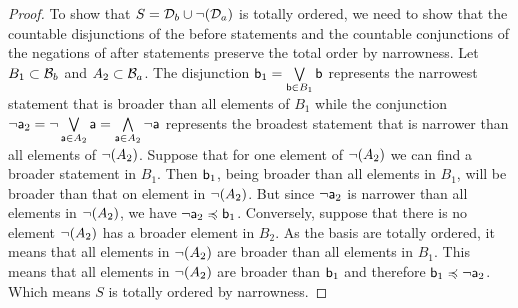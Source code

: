 \documentclass[11pt,letterpaper,fleqn]{memoir} %
\begin{document}
\begin{mathSection}
\begin{proof}
	To show that $S=\edomain_b \cup \NOT (\edomain_a)$ is totally ordered, we need to show that the countable disjunctions of the before statements and the countable conjunctions of the negations of after statements preserve the total order by narrowness. Let $B_1 \subset \basis_b$ and $A_2 \subset \basis_a$. The disjunction $\stmt[b]_1 = \bigOR\limits_{\stmt[b] \in B_1} \stmt[b]$ represents the narrowest statement that is broader than all elements of $B_1$ while the conjunction $\NOT \stmt[a]_2 = \NOT \bigOR\limits_{\stmt[a] \in A_2} \stmt[a] = \bigAND\limits_{\stmt[a] \in A_2} \NOT \stmt[a]$ represents the broadest statement that is narrower than all elements of $\NOT(A_2)$. Suppose that for one element of $\NOT(A_2)$ we can find a broader statement in $B_1$. Then $\stmt[b]_1$, being broader than all elements in $B_1$, will be broader than that on element in $\NOT(A_2)$. But since $\NOT \stmt[a]_2$ is narrower than all elements in $\NOT(A_2)$, we have $\NOT \stmt[a]_2 \narrower \stmt[b]_1$. Conversely, suppose that there is no element $\NOT(A_2)$ has a broader element in $B_2$. As the basis are totally ordered, it means that all elements in $\NOT(A_2)$ are broader than all elements in $B_1$. This means that all elements in $\NOT(A_2)$ are broader than $\stmt[b]_1$ and therefore $\stmt[b]_1 \narrower \NOT \stmt[a]_2$. Which means $S$ is totally ordered by narrowness.
\end{proof}
\end{mathSection}
\end{document}
